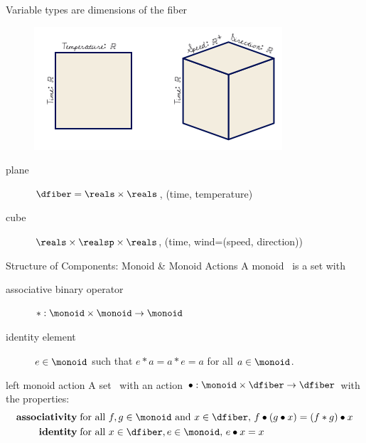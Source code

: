 \documentclass[xcolor={dvipsnames}, handout]{beamer}
\begin{document}
\begin{frame}{Variable types are dimensions of the fiber}
    \begin{figure}[H]
        \includegraphics[width=\textwidth]{figures/math/fiber.png}
        \caption{}
        \label{fig:data_fiber_example}
    \end{figure}
    \begin{description}
        \item[plane]  $\dfiber=\reals\times\reals$, (time, temperature)
        \item[cube]  $\reals\times\realsp\times\reals$, (time, wind=(speed, direction))
    \end{description}
\end{frame}


\begin{frame}{Structure of Components: Monoid \& Monoid Actions}
A monoid \monoid\ is a set with
\begin{description}
    \item[associative binary operator] $\ast:\monoid \times \monoid\rightarrow \monoid$
    \item[identity element] $e\in \monoid$ such that $e\ast a= a \ast e = a$ for all $a \in \monoid$. 
\end{description}
\pause
\begin{block}{left monoid action}
A set \dfiber\ with an action\cite{nlab:action} $\bullet: \monoid\times \dfiber \rightarrow \dfiber$ with the properties:
    \begin{align*}
        \textbf{associativity}\;& \text{for all } f,g \in \monoid \text{ and } x\in \dfiber,\, f\bullet(g\bullet x) = (f\ast g) \bullet x\\
        \textbf{identity}\;& \text{for all } x\in \dfiber, e\in \monoid,\,  e\bullet x = x 
    \end{align*}
\end{block}
\end{frame}
\end{document}
